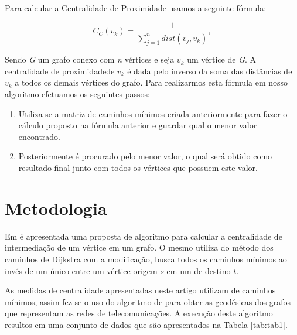 \documentclass[12pt]{article}
\begin{document}
Para calcular a Centralidade de Proximidade usamos a seguinte fórmula:
\begin{center}
\begin{equation}
C_C(v_k)=\frac{1}{\sum\limits_{j = 1}^n dist(v_j,v_k)},
\end{equation}
\end{center}
Sendo {\it G} um grafo conexo com {\it n} vértices e seja $v_k$ um vértice de {\it G}. A centralidade de proximidadede $v_k$ é dada pelo inverso da soma das distâncias de $v_k$ a todos os demais vértices do grafo.
Para realizarmos esta fórmula em nosso algoritmo efetuamos os seguintes passos:
\begin{enumerate}
\item Utiliza-se a matriz de caminhos mínimos criada anteriormente para fazer o cálculo proposto na fórmula anterior e guardar qual o menor valor encontrado.
\item Posteriormente é procurado pelo menor valor, o qual será obtido como resultado final junto com todos os vértices que possuem este valor.
\end{enumerate}

\section{Metodologia}\label{sec:met}
Em \cite{Brandes01afaster} é apresentada uma proposta de algoritmo para calcular a centralidade de intermediação de um vértice em um grafo. O mesmo utiliza do método dos caminhos de Dijkstra com a modificação, busca todos os caminhos mínimos ao invés de um único entre um vértice origem $s$ em um de destino $t$.

As medidas de centralidade apresentadas neste artigo utilizam de caminhos mínimos, assim fez-se o uso do algoritmo de \cite{Brandes01afaster} para obter as geodésicas dos grafos que representam as redes de telecomunicações.
A execução deste algoritmo resultos em uma conjunto de dados que são apresentados na Tabela \ref{tab:tab1}. 
\end{document}
